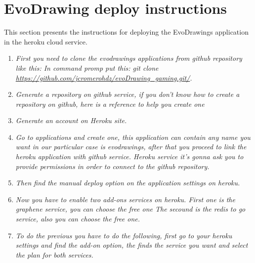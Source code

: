 \chapter{EvoDrawing deploy instructions}\label{apendixa}

This section presents the instructions for deploying the EvoDrawings application
in the heroku cloud service.

\begin{enumerate}


\item \textit{First you need to clone the evodrawings
applications from github repository like this: In command promp put this:
git clone \url{https://github.com/jcromerohdz/evoDrawing_gaming.git/}. }


\item \textit{
Generate a repository on github service, if you don’t know how to create a
repository on github, here is a reference to help you create one \cite{}}

\item\textit{Generate an account on Heroku site.}

\item \textit{Go to applications and create one, this application can contain
any name you want in our particular case is evodrawings, after that you proceed
to link the heroku application with github service. Heroku service it’s gonna
ask you to provide permissions in order to connect to the github repository.}

\item \textit{Then find the manual deploy option on the application settings on
heroku.}

\item \textit{Now you have to enable two add-ons services on heroku.
First one is the graphene service, you can choose the free one
The secound is the redis to go service, also you can choose the free one.}

\item \textit{To do the previous you have to do the following, first go to your heroku
settings and find the add-on option, the finds the service you want and select
the plan for both services.}





\end{enumerate}
